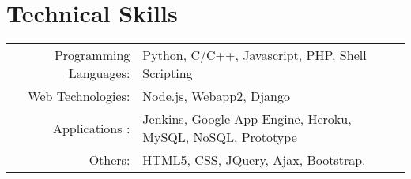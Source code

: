 \section{Technical Skills}
\renewcommand{\arraystretch}{1}%
\begin{tabular}{rl}

Programming Languages: &  Python, C/C++, Javascript, PHP, Shell Scripting\\
Web Technologies: & Node.js, Webapp2,  Django\\
Applications : & Jenkins, Google App Engine, Heroku, MySQL, NoSQL, Prototype\\
Others: & HTML5, CSS, JQuery, Ajax, Bootstrap. \\
\end{tabular}
\vspace{5pt}

